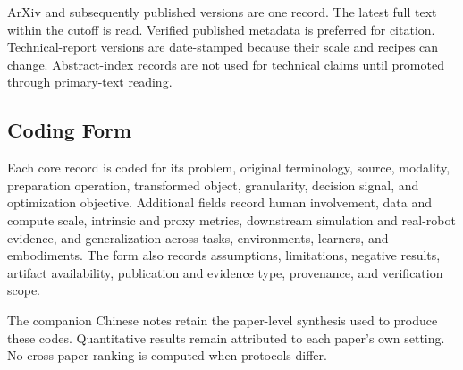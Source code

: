 ArXiv and subsequently published versions are one record.
The latest full text within the cutoff is read.
Verified published metadata is preferred for citation.
Technical-report versions are date-stamped because their scale and recipes can change.
Abstract-index records are not used for technical claims until promoted through primary-text reading.

\subsection{Coding Form}

Each core record is coded for its problem, original terminology, source, modality, preparation operation, transformed object, granularity, decision signal, and optimization objective.
Additional fields record human involvement, data and compute scale, intrinsic and proxy metrics, downstream simulation and real-robot evidence, and generalization across tasks, environments, learners, and embodiments.
The form also records assumptions, limitations, negative results, artifact availability, publication and evidence type, provenance, and verification scope.

The companion Chinese notes retain the paper-level synthesis used to produce these codes.
Quantitative results remain attributed to each paper's own setting.
No cross-paper ranking is computed when protocols differ.
